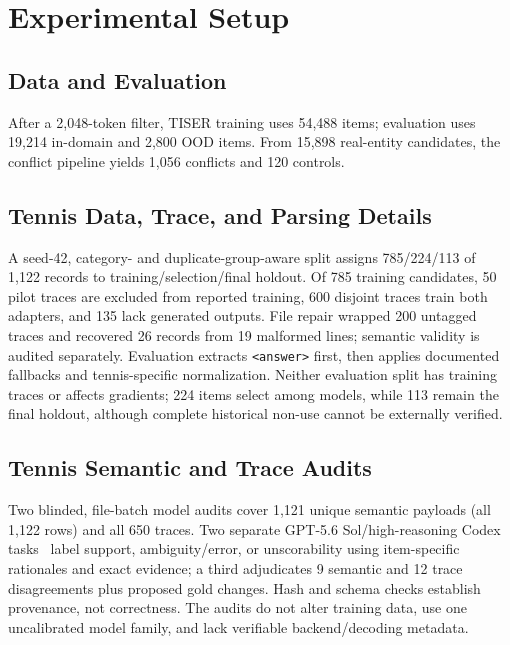 \documentclass[conference]{IEEEtran}
\begin{document}
\section{Experimental Setup}
\label{sec:experimental-setup}

\subsection{Data and Evaluation}

After a 2,048-token filter, TISER training uses 54,488 items; evaluation uses 19,214 in-domain and 2,800 OOD items. From 15,898 real-entity candidates, the conflict pipeline yields 1,056 conflicts and 120 controls.

\subsection{Tennis Data, Trace, and Parsing Details}

A seed-42, category- and duplicate-group-aware split assigns 785/224/113 of 1,122 records to training/selection/final holdout. Of 785 training candidates, 50 pilot traces are excluded from reported training, 600 disjoint traces train both adapters, and 135 lack generated outputs. File repair wrapped 200 untagged traces and recovered 26 records from 19 malformed lines; semantic validity is audited separately. Evaluation extracts \texttt{<answer>} first, then applies documented fallbacks and tennis-specific normalization. Neither evaluation split has training traces or affects gradients; 224 items select among models, while 113 remain the final holdout, although complete historical non-use cannot be externally verified.

\subsection{Tennis Semantic and Trace Audits}

Two blinded, file-batch model audits cover 1,121 unique semantic payloads (all 1,122 rows) and all 650 traces. Two separate GPT-5.6 Sol/high-reasoning Codex tasks~\cite{openai2026codexapp} label support, ambiguity/error, or unscorability using item-specific rationales and exact evidence; a third adjudicates 9 semantic and 12 trace disagreements plus proposed gold changes. Hash and schema checks establish provenance, not correctness. The audits do not alter training data, use one uncalibrated model family, and lack verifiable backend/decoding metadata.
\end{document}
